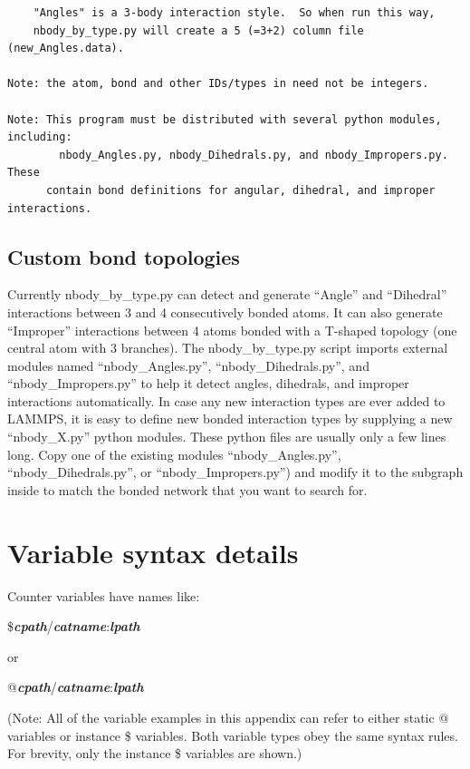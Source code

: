 \documentclass[11pt]{article}
\begin{document}
\begin{verbatim}
    "Angles" is a 3-body interaction style.  So when run this way, 
    nbody_by_type.py will create a 5 (=3+2) column file (new_Angles.data).

Note: the atom, bond and other IDs/types in need not be integers.

Note: This program must be distributed with several python modules, including:
        nbody_Angles.py, nbody_Dihedrals.py, and nbody_Impropers.py.  These
      contain bond definitions for angular, dihedral, and improper interactions.
\end{verbatim}

\subsection{Custom bond topologies}
\label{sec:nbody_by_type_custom}
  Currently nbody\_by\_type.py can detect and generate ``Angle'' 
and ``Dihedral'' interactions between 3 and 4 consecutively bonded atoms. 
It can also generate ``Improper'' interactions between 4 atoms bonded 
with a T-shaped topology (one central atom with 3 branches). 
The nbody\_by\_type.py script imports external modules named 
``nbody\_Angles.py'', ``nbody\_Dihedrals.py'', and ``nbody\_Impropers.py'' 
to help it detect angles, dihedrals, and improper interactions automatically.
In case any new interaction types are ever added to LAMMPS, 
it is easy to define new bonded interaction types by supplying 
a new ``nbody\_X.py'' python modules. 
These python files are usually only a few lines long. 
Copy one of the existing modules 
``nbody\_Angles.py'', ``nbody\_Dihedrals.py'', or ``nbody\_Impropers.py'') 
and modify it to the subgraph inside to match the bonded network 
that you want to search for.





\section{Variable syntax details}
\label{sec:adv_variable_syntax}

Counter variables have names like:

\$\textit{\textbf{cpath}}/\textit{\textbf{catname}}:\textit{\textbf{lpath}}

or

@\textit{\textbf{cpath}}/\textit{\textbf{catname}}:\textit{\textbf{lpath}}

(Note: All of the variable examples in this appendix can refer to either 
static @ variables or instance \$ variables.  Both variable types obey the
same syntax rules.  For brevity, only the instance \$ variables are shown.)
\end{document}
